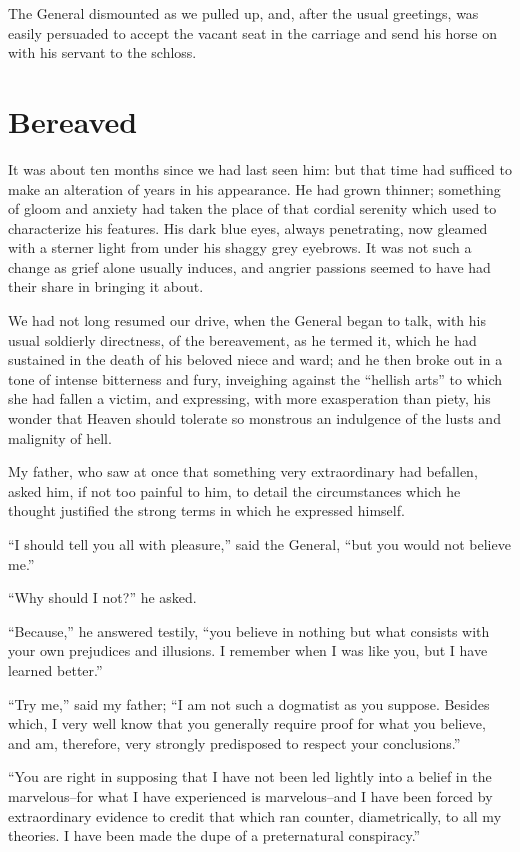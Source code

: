 \documentclass[11pt,twoside,makeidx,hidelinks,]{memoir}
\begin{document}
The General dismounted as we pulled up, and, after the usual greetings,
was easily persuaded to accept the vacant seat in the carriage and send
his horse on with his servant to the schloss.

\pbreak{}

\chapter{Bereaved}\hypertarget{bereaved}{}\label{bereaved}

It was about ten months since we had last seen him: but that time had
sufficed to make an alteration of years in his appearance. He had grown
thinner; something of gloom and anxiety had taken the place of that
cordial serenity which used to characterize his features. His dark blue
eyes, always penetrating, now gleamed with a sterner light from under
his shaggy grey eyebrows. It was not such a change as grief alone
usually induces, and angrier passions seemed to have had their share in
bringing it about.

We had not long resumed our drive, when the General began to talk, with
his usual soldierly directness, of the bereavement, as he termed it,
which he had sustained in the death of his beloved niece and ward; and
he then broke out in a tone of intense bitterness and fury, inveighing
against the ``hellish arts'' to which she had fallen a victim, and
expressing, with more exasperation than piety, his wonder that Heaven
should tolerate so monstrous an indulgence of the lusts and malignity
of hell.

My father, who saw at once that something very extraordinary had
befallen, asked him, if not too painful to him, to detail the
circumstances which he thought justified the strong terms in which he
expressed himself.

``I should tell you all with pleasure,'' said the General, ``but you would
not believe me.''

``Why should I not?'' he asked.

``Because,'' he answered testily, ``you believe in nothing but what
consists with your own prejudices and illusions. I remember when I was
like you, but I have learned better.''

``Try me,'' said my father; ``I am not such a dogmatist as you suppose.
Besides which, I very well know that you generally require proof for
what you believe, and am, therefore, very strongly predisposed to
respect your conclusions.''

``You are right in supposing that I have not been led lightly into a
belief in the marvelous--for what I have experienced is marvelous--and I
have been forced by extraordinary evidence to credit that which ran
counter, diametrically, to all my theories. I have been made the dupe of
a preternatural conspiracy.''
\end{document}
